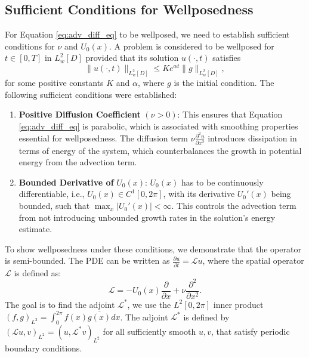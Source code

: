 \subsection{Sufficient Conditions for Wellposedness}\label{sub:wellposedness}
For Equation \ref{eq:adv_diff_eq} to be wellposed, we need to establish sufficient conditions for $\nu$ and $U_0(x)$.
A problem is considered to be wellposed for $t \in [0, T]$ in $L^2_w[D]$ provided that its solution $u(\cdot, t)$ satisfies
\begin{equation}
	\|u(\cdot, t)\|_{L_w^2[D]} \leq K e^{\alpha t}\|g\|_{L_w^2[D]},
	\label{eq:wellposed_def}
\end{equation}
for some positive constants $K$ and $\alpha$, where $g$ is the initial condition. \newline
\newline
The following sufficient conditions were established:
\begin{enumerate}
	\item \textbf{Positive Diffusion Coefficient} $(\nu > 0)$: This ensures that Equation \ref{eq:adv_diff_eq} is parabolic, which is associated with smoothing properties essential for wellposedness. The diffusion term $\nu \frac{\partial^2 u}{\partial x^2}$ introduces dissipation in terms of energy of the system, which counterbalances the growth in potential energy from the advection term.
	\item \textbf{Bounded Derivative of} $U_0(x)$: $U_0(x)$ has to be continuously differentiable, i.e., $U_0(x) \in C^1[0,2\pi]$, with its derivative $U_0'(x)$ being bounded, such that $\max_x|U_0'(x)| < \infty$. This controls  the advection term from not introducing unbounded growth rates in the solution's energy estimate.
\end{enumerate}
%
To show wellposedness under these conditions, we demonstrate that the operator is semi-bounded. The PDE can be written as $\frac{\partial u}{\partial t} = \mathcal{L}u$, where the spatial operator $\mathcal{L}$ is defined as:
\begin{equation}
	\mathcal{L} = - U_0(x) \frac{\partial}{\partial x} + \nu \frac{\partial^2}{\partial x^2}.
	\label{eq:oper_semi_bound}
\end{equation}
The goal is to find the adjoint $\mathcal{L}^*$, we use the $L^2[0, 2\pi]$ inner product $(f,g)_{L^2} = \int_0^{2\pi} f(x) \overline{g(x)} dx$. The adjoint $\mathcal{L}^*$ is defined by $(\mathcal{L}u, v)_{L^2} = (u, \mathcal{L}^*v)_{L^2}$ for all sufficiently smooth $u,v$, that satisfy periodic boundary conditions.
